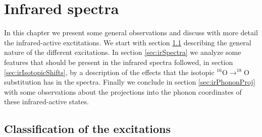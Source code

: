 \chapter{Infrared spectra}
\label{chap:irSpectra}

In this chapter we present some general observations and discuss with more detail the infrared-active exctitations.
We start with section \ref{sec:classification} describing the general nature of the different excitations. 
In section \ref{sec:irSpectra} we analyze some features that should be present in the infrared spectra followed, in section \ref{sec:irIsotopicShifts}, by a description of the effects that the isotopic $^{16}$O$\rightarrow ^{18}$O substitution has in the spectra. 
Finally we conclude in section \ref{sec:irPhononProj} with some observations about the projections into the phonon coordinates of these infrared-active states.

\section{Classification of the excitations}
\label{sec:classification}

